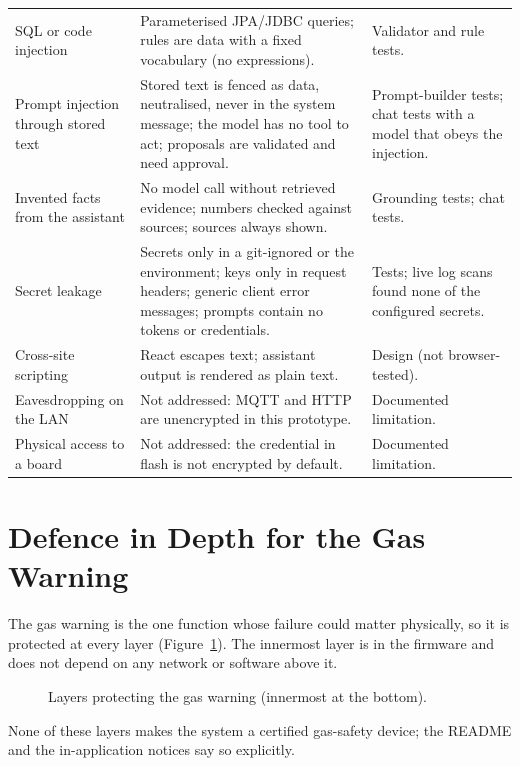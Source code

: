 \documentclass[12pt,a4paper,oneside]{report}
\newcommand{\code}[1]{\texttt{\detokenize{#1}}}
\begin{document}
\begin{longtable}{@{}p{3.0cm}p{6.2cm}p{5.4cm}@{}}
SQL or code injection & Parameterised JPA/JDBC queries; rules are data with a fixed vocabulary (no expressions). & Validator and rule tests.\\
Prompt injection through stored text & Stored text is fenced as data, neutralised, never in the system message; the model has no tool to act; proposals are validated and need approval. & Prompt-builder tests; chat tests with a model that obeys the injection.\\
Invented facts from the assistant & No model call without retrieved evidence; numbers checked against sources; sources always shown. & Grounding tests; chat tests.\\
Secret leakage & Secrets only in a git-ignored \code{.env} or the environment; keys only in request headers; generic client error messages; prompts contain no tokens or credentials. & Tests; live log scans found none of the configured secrets.\\
Cross-site scripting & React escapes text; assistant output is rendered as plain text. & Design (not browser-tested).\\
Eavesdropping on the LAN & Not addressed: MQTT and HTTP are unencrypted in this prototype. & Documented limitation.\\
Physical access to a board & Not addressed: the credential in flash is not encrypted by default. & Documented limitation.\\
\bottomrule
\end{longtable}

\section{Defence in Depth for the Gas Warning}
The gas warning is the one function whose failure could matter physically, so it is protected at every layer (Figure~\ref{fig:gas-layers}). The innermost layer is in the firmware and does not depend on any network or software above it.

\begin{figure}[H]
\centering
{}
\caption{Layers protecting the gas warning (innermost at the bottom).}
\label{fig:gas-layers}
\end{figure}
None of these layers makes the system a certified gas-safety device; the README and the in-application notices say so explicitly.
\end{document}
